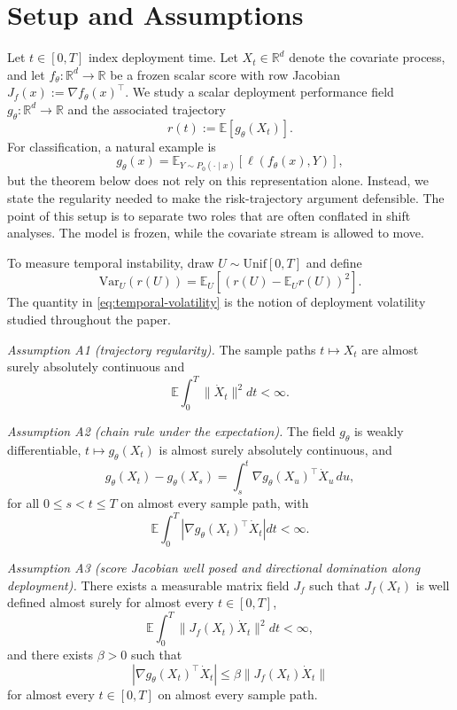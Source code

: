 \documentclass[conference]{IEEEtran}
\newcommand{\E}{\mathbb{E}}
\newcommand{\Var}{\mathrm{Var}}
\newcommand{\R}{\mathbb{R}}
\begin{document}
\section{Setup and Assumptions}
Let $t\in[0,T]$ index deployment time. Let $X_t\in\R^d$ denote the covariate process, and let $f_\theta:\R^d\to\R$ be a frozen scalar score with row Jacobian $J_f(x):=\nabla f_\theta(x)^\top$. We study a scalar deployment performance field $g_\theta:\R^d\to\R$ and the associated trajectory
\begin{equation}
\label{eq:risk-trajectory}
r(t):=\E[g_\theta(X_t)].
\end{equation}
For classification, a natural example is
\[
g_\theta(x)=\E_{Y\sim P_0(\cdot\mid x)}[\ell(f_\theta(x),Y)],
\]
but the theorem below does not rely on this representation alone. Instead, we state the regularity needed to make the risk-trajectory argument defensible.
The point of this setup is to separate two roles that are often conflated in shift analyses. The model is frozen, while the covariate stream is allowed to move.

To measure temporal instability, draw $U\sim\mathrm{Unif}[0,T]$ and define
\begin{equation}
\label{eq:temporal-volatility}
\Var_U(r(U))=\E_U[(r(U)-\E_U r(U))^2].
\end{equation}
The quantity in \eqref{eq:temporal-volatility} is the notion of deployment volatility studied throughout the paper.

\textit{Assumption A1 (trajectory regularity).} The sample paths $t\mapsto X_t$ are almost surely absolutely continuous and
\[
\E\int_0^T \|\dot X_t\|^2dt < \infty.
\]

\textit{Assumption A2 (chain rule under the expectation).} The field $g_\theta$ is weakly differentiable, $t\mapsto g_\theta(X_t)$ is almost surely absolutely continuous, and
\[
g_\theta(X_t)-g_\theta(X_s)=\int_s^t \nabla g_\theta(X_u)^\top \dot X_u\,du,
\]
for all $0\le s<t\le T$ on almost every sample path, with
\[
\E\int_0^T |\nabla g_\theta(X_t)^\top \dot X_t|dt < \infty.
\]

\textit{Assumption A3 (score Jacobian well posed and directional domination along deployment).} There exists a measurable matrix field $J_f$ such that $J_f(X_t)$ is well defined almost surely for almost every $t\in[0,T]$,
\[
\E\int_0^T \|J_f(X_t)\dot X_t\|^2dt < \infty,
\]
and there exists $\beta>0$ such that
\[
|\nabla g_\theta(X_t)^\top \dot X_t| \le \beta \|J_f(X_t)\dot X_t\|
\]
for almost every $t\in[0,T]$ on almost every sample path.
\end{document}
